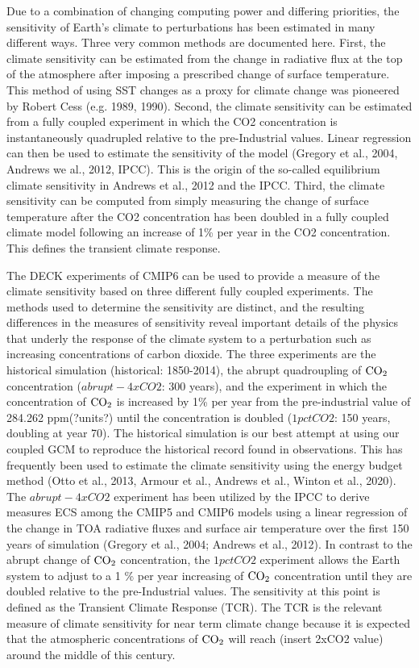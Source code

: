 \documentclass[11pt]{article}   	%
\begin{document}
Due to a combination of changing computing power and differing priorities, the sensitivity of Earth's climate to 
perturbations has been estimated in many different ways.  Three very common methods are documented 
here.  First, the climate sensitivity can be estimated from the change in radiative flux at the top of the 
atmosphere after imposing a prescribed change of surface temperature.  This method of using SST changes
as a proxy for climate change was pioneered by Robert Cess (e.g. 1989, 1990).  Second, the climate
sensitivity can be estimated from a fully coupled experiment in which the CO2 concentration is instantaneously 
quadrupled relative to the pre-Industrial values.  Linear regression can then be used to estimate the 
sensitivity of the model (Gregory et al., 2004, Andrews we al., 2012, IPCC).  This is the origin of the 
so-called equilibrium climate sensitivity in Andrews et al., 2012 and the IPCC.  Third, the climate sensitivity
can be computed from simply measuring the change of surface temperature after the CO2 concentration
has been doubled in a fully coupled climate model following an increase of 1\% per year in the CO2 concentration.
This defines the transient climate response.  
    
The DECK experiments of CMIP6 can be used to provide a measure of the climate sensitivity based on 
three different fully coupled experiments.  The methods used to determine the sensitivity are distinct, and the resulting 
differences in the measures of sensitivity reveal important details of the physics that underly the response
of the climate system to a perturbation such as increasing concentrations of carbon dioxide.  The three 
experiments are the historical simulation (historical: 1850-2014),  the abrupt quadroupling of 
$\rm{CO}_2$ concentration ($abrupt-4xCO2$: 300 years), and the experiment in which the 
concentration of $\rm{CO}_2$ is increased by 1\% 
 per year from the pre-industrial value of 284.262 ppm(?units?) until the concentration is doubled ($1pctCO2$: 150 years, doubling at year 70).  
The historical simulation is our best attempt at using our coupled GCM to reproduce the historical 
record found in observations.  This has frequently been used to estimate the climate sensitivity using the 
energy budget method (Otto et al., 2013, Armour et al., Andrews et al., Winton et al., 2020).  The 
$abrupt-4xCO2$
experiment has been utilized by the IPCC to derive measures ECS among the CMIP5 and CMIP6 models
using a linear regression of the change in TOA radiative fluxes and surface air temperature over the first 
150 years of simulation (Gregory et al., 2004; Andrews et al., 2012).  In contrast to the abrupt change of 
$\rm{CO}_2$ concentration, the $1pctCO2$ experiment allows the Earth system to adjust to 
a 1 \% per year increasing of $\rm{CO}_2$ concentration until they are doubled relative to the 
pre-Industrial values.  The sensitivity at this point is defined 
as the Transient Climate Response (TCR).  The TCR is the relevant measure of climate sensitivity for 
near term climate change because it is expected that the atmospheric concentrations of $\rm{CO}_2$ 
will reach (insert 2xCO2 value) around the middle of this century.         
\end{document}
